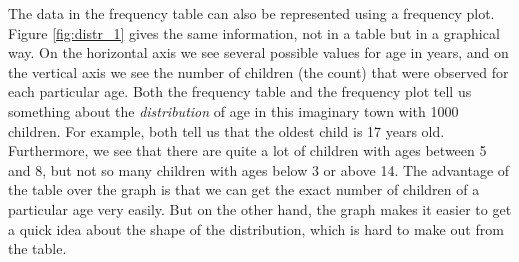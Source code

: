 \begin{kframe}


{\ttfamily\noindent\bfseries{}}\end{kframe}

\begin{knitrout}
\color{fgcolor}\begin{kframe}


{\ttfamily\noindent\bfseries{}}\end{kframe}
\end{knitrout}

The data in the frequency table can also be represented using a frequency plot. Figure \ref{fig:distr_1} gives the same information, not in a table but in a graphical way. On the horizontal axis we see several possible values for age in years, and on the vertical axis we see the number of children (the count) that were observed for each particular age. Both the frequency table and the frequency plot tell us something about the \textit{distribution} of age in this imaginary town with 1000 children. For example, both tell us that the oldest child is 17 years old. Furthermore, we see that there are quite a lot of children with ages between 5 and 8, but not so many children with ages below 3 or above 14. The advantage of the table over the graph is that we can get the exact number of children of a particular age very easily. But on the other hand, the graph makes it easier to get a quick idea about the shape of the distribution, which is hard to make out from the table.



